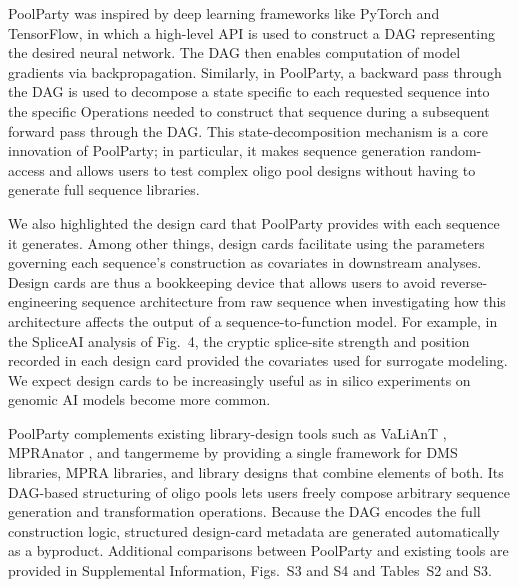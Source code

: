 \documentclass[pdflatex,sn-vancouver-num,referee,oneside]{sn-jnl}
\newif\ifshowquoted
\newcommand{\quoted}[1]{\ifshowquoted\textcolor{quotedtext}{#1}\else#1\fi}
\begin{document}
PoolParty was inspired by deep learning frameworks like PyTorch and TensorFlow, in which a high-level API is used to construct a DAG representing the desired neural network. The DAG then enables computation of model gradients via backpropagation. Similarly, in PoolParty, a backward pass through the DAG is used to decompose a state specific to each requested sequence into the specific Operations needed to construct that sequence during a subsequent forward pass through the DAG. This state-decomposition mechanism is a core innovation of PoolParty; in particular, it makes sequence generation random-access and allows users to test complex oligo pool designs without having to generate full sequence libraries.

We also highlighted the design card that PoolParty provides with each sequence it generates. Among other things, design cards facilitate using the parameters governing each sequence's construction as covariates in downstream analyses. \quoted{Design cards are thus a bookkeeping device that allows users to avoid reverse-engineering sequence architecture from raw sequence when investigating how this architecture affects the output of a sequence-to-function model.} \quoted{For example, in the SpliceAI analysis of Fig.~4, the cryptic splice-site strength and position recorded in each design card provided the covariates used for surrogate modeling.} We expect design cards to be increasingly useful as in silico experiments on genomic AI models become more common.

\quoted{PoolParty complements existing library-design tools such as VaLiAnT \citep{Barbon2022th}, MPRAnator \citep{GeorgakopoulosSoares2017gb}, and tangermeme \citep{Schreiber2025nd} by providing a single framework for DMS libraries, MPRA libraries, and library designs that combine elements of both.} Its DAG-based structuring of oligo pools lets users freely compose arbitrary sequence generation and transformation operations. Because the DAG encodes the full construction logic, structured design-card metadata are generated automatically as a byproduct. \quoted{Additional comparisons between PoolParty and existing tools are provided in Supplemental Information, Figs.~S3 and S4 and Tables~S2 and S3.}
\end{document}
